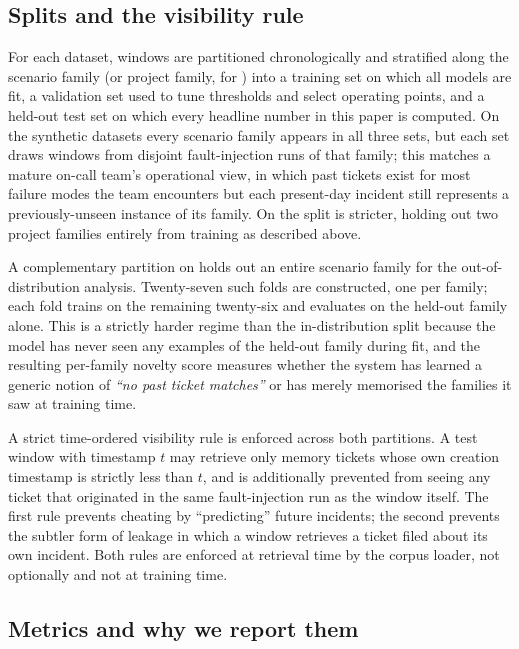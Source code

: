 \subsection{Splits and the visibility rule}
\label{sec:evaluation:splits}

For each dataset, windows are partitioned chronologically and stratified along the scenario family (or project family, for \dswol{}) into a training set on which all models are fit, a validation set used to tune thresholds and select operating points, and a held-out test set on which every headline number in this paper is computed. On the synthetic datasets every scenario family appears in all three sets, but each set draws windows from disjoint fault-injection runs of that family; this matches a mature on-call team's operational view, in which past tickets exist for most failure modes the team encounters but each present-day incident still represents a previously-unseen instance of its family. On \dswol{} the split is stricter, holding out two project families entirely from training as described above.

A complementary partition on \dsob{} holds out an entire scenario family for the out-of-distribution analysis. Twenty-seven such folds are constructed, one per family; each fold trains on the remaining twenty-six and evaluates on the held-out family alone. This is a strictly harder regime than the in-distribution split because the model has never seen any examples of the held-out family during fit, and the resulting per-family novelty score measures whether the system has learned a generic notion of \emph{``no past ticket matches''} or has merely memorised the families it saw at training time.

A strict time-ordered visibility rule is enforced across both partitions. A test window with timestamp $t$ may retrieve only memory tickets whose own creation timestamp is strictly less than $t$, and is additionally prevented from seeing any ticket that originated in the same fault-injection run as the window itself. The first rule prevents cheating by ``predicting'' future incidents; the second prevents the subtler form of leakage in which a window retrieves a ticket filed about its own incident. Both rules are enforced at retrieval time by the corpus loader, not optionally and not at training time.

\subsection{Metrics and why we report them}
\label{sec:evaluation:metrics}

